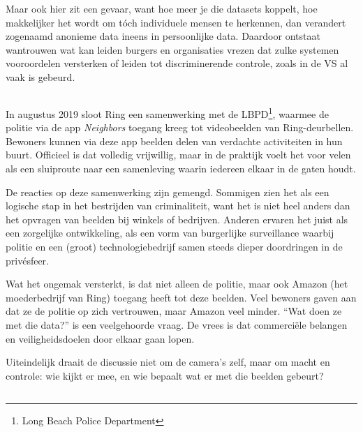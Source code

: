 \documentclass[nonacm,sigconf]{acmart}
\begin{document}
    Maar ook hier zit een gevaar, want hoe meer je die datasets koppelt, hoe makkelijker het wordt om tóch individuele mensen te herkennen, dan verandert zogenaamd anonieme data ineens in persoonlijke data.
    Daardoor ontstaat wantrouwen wat kan leiden burgers en organisaties vrezen dat zulke systemen vooroordelen versterken of leiden tot discriminerende controle, zoals in de VS al vaak is gebeurd.

    \subsection{}
    \parencite{shaffer2021applying} In augustus 2019 sloot Ring een samenwerking met de LBPD\footnote{Long Beach Police Department}, waarmee de politie via de app \textit{Neighbors} toegang kreeg tot videobeelden van Ring-deurbellen. Bewoners kunnen via deze app beelden delen van verdachte activiteiten in hun buurt. Officieel is dat volledig vrijwillig, maar in de praktijk voelt het voor velen als een sluiproute naar een samenleving waarin iedereen elkaar in de gaten houdt.

    De reacties op deze samenwerking zijn gemengd.
    Sommigen zien het als een logische stap in het bestrijden van criminaliteit, want het is niet heel anders dan het opvragen van beelden bij winkels of bedrijven.
    Anderen ervaren het juist als een zorgelijke ontwikkeling, als een vorm van burgerlijke surveillance waarbij politie en een (groot) technologiebedrijf samen steeds dieper doordringen in de privésfeer.

    Wat het ongemak versterkt, is dat niet alleen de politie, maar ook Amazon (het moederbedrijf van Ring) toegang heeft tot deze beelden.
    Veel bewoners gaven aan dat ze de politie op zich vertrouwen, maar Amazon veel minder. “Wat doen ze met die data?” is een veelgehoorde vraag.
    De vrees is dat commerciële belangen en veiligheidsdoelen door elkaar gaan lopen.

    Uiteindelijk draait de discussie niet om de camera’s zelf, maar om macht en controle: wie kijkt er mee, en wie bepaalt wat er met die beelden gebeurt?

    \subsection{}
    \parencite{liu2021ethical}
\end{document}
